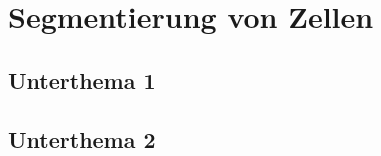 \section{Segmentierung von Zellen}%
\label{sec:main}

\subsection{Unterthema 1}
\subsection{Unterthema 2}
